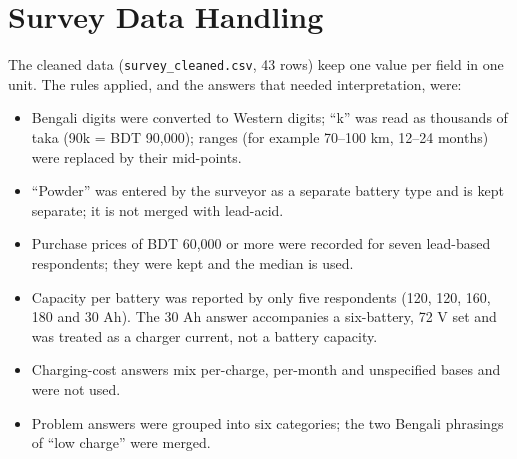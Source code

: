 \documentclass[11pt,a4paper]{article}
\newcommand{\appendices}{\appendix}
\begin{document}
\appendices
\section{Survey Data Handling}
\label{app:survey}
The cleaned data (\texttt{survey\_cleaned.csv}, 43 rows) keep one value per field in one unit. The rules applied, and the answers that needed interpretation, were:
\begin{itemize}
\item Bengali digits were converted to Western digits; ``k'' was read as thousands of taka (90k = BDT 90{,}000); ranges (for example 70--100 km, 12--24 months) were replaced by their mid-points.
\item ``Powder'' was entered by the surveyor as a separate battery type and is kept separate; it is not merged with lead-acid.
\item Purchase prices of BDT 60{,}000 or more were recorded for seven lead-based respondents; they were kept and the median is used.
\item Capacity per battery was reported by only five respondents (120, 120, 160, 180 and 30 Ah). The 30 Ah answer accompanies a six-battery, 72 V set and was treated as a charger current, not a battery capacity.
\item Charging-cost answers mix per-charge, per-month and unspecified bases and were not used.
\item Problem answers were grouped into six categories; the two Bengali phrasings of ``low charge'' were merged.
\end{itemize}
\end{document}

